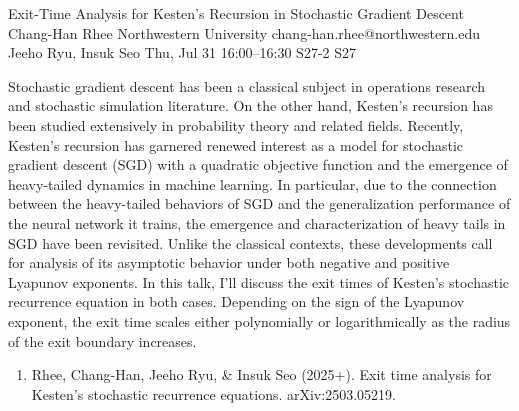 \documentclass[12pt,lettersize,oneside]{book} %
\begin{document}
\begin{talk}
  {Exit-Time Analysis for Kesten's Recursion in Stochastic Gradient Descent}%
  {Chang-Han Rhee}%
  {Northwestern University}%
  {chang-han.rhee@northwestern.edu}%
  {Jeeho Ryu, Insuk Seo}%
  {}%
  {Thu, Jul 31 16:00--16:30}%
  {S27-2}%
  {S27}%
  
    


Stochastic gradient descent has been a classical subject in operations research and stochastic simulation literature.
On the other hand, Kesten's recursion has been studied extensively in probability theory and related fields. 
Recently, Kesten's recursion has garnered renewed interest as a model for stochastic
gradient descent (SGD) with a quadratic objective function and the emergence of heavy-tailed dynamics in machine learning. 
In particular, due to the connection between the heavy-tailed behaviors of SGD and the generalization performance of the neural network it trains, the emergence and characterization of heavy tails in SGD have been revisited. 
Unlike the classical contexts, these developments call for analysis of its asymptotic behavior under both negative and positive Lyapunov exponents. In this talk, I'll discuss the exit times of Kesten's stochastic recurrence equation in both cases. Depending on the sign of the Lyapunov exponent, the exit time scales either polynomially or logarithmically as the radius of the exit boundary increases.

\medskip

\begin{enumerate}
 \item[{[1]}] 
    Rhee, Chang-Han, Jeeho Ryu, \& Insuk Seo (2025+). Exit time analysis for Kesten's stochastic recurrence equations. arXiv:2503.05219.
    

\end{enumerate}

\end{talk}
\end{document}

